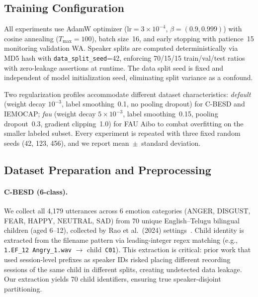 \documentclass[11pt,a4paper]{article}
\begin{document}
\subsection{Training Configuration}
\label{ssec:training}

All experiments use AdamW optimizer ($\text{lr}=3\times 10^{-4}$,
$\beta=(0.9,0.999)$) with cosine annealing ($T_{\text{max}}=100$), batch
size~16, and early stopping with patience~15 monitoring validation WA.
Speaker splits are computed deterministically via MD5 hash with
\texttt{data\_split\_seed}=42, enforcing 70/15/15 train/val/test ratios with
zero-leakage assertions at runtime. The data split seed is fixed and
independent of model initialization seed, eliminating split variance as a
confound.

Two regularization profiles accommodate different dataset characteristics:
\textit{default} (weight decay $10^{-3}$, label smoothing~0.1, no pooling
dropout) for C-BESD and IEMOCAP; \textit{fau} (weight decay $5\times 10^{-3}$,
label smoothing~0.15, pooling dropout~0.3, gradient clipping~1.0) for FAU Aibo
to combat overfitting on the smaller labeled subset. Every experiment is
repeated with three fixed random seeds (42, 123, 456), and we report
mean~$\pm$~standard deviation.

\subsection{Dataset Preparation and Preprocessing}
\label{ssec:datasets}

\paragraph{C-BESD (6-class).} We collect all 4,179 utterances across 6 emotion
categories (ANGER, DISGUST, FEAR, HAPPY, NEUTRAL, SAD) from 70 unique English--Telugu bilingual
children (aged 6--12), collected by Rao et al.\ (2024)
settings~\cite{sazali2023besd,rao2024cbesd}. Child identity
is extracted from the filename pattern via leading-integer regex matching (e.g.,
\texttt{1.EF\_12 Angry\_1.wav} $\rightarrow$ child~\texttt{C01}). This
extraction is critical: prior work that used session-level prefixes as speaker
IDs risked placing different recording sessions of the same child in different
splits, creating undetected data leakage. Our extraction yields 70 child
identifiers, ensuring true speaker-disjoint partitioning.
\end{document}
